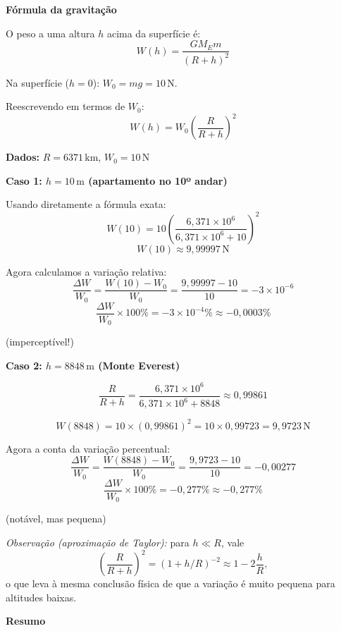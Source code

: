 
\textbf{Fórmula da gravitação}

O peso a uma altura $h$ acima da superfície é:
\[
W(h) = \frac{GM_E m}{(R+h)^2}
\]

Na superfície ($h=0$): $W_0 = mg = 10\,\text{N}$.

Reescrevendo em termos de $W_0$:
\[
W(h) = W_0 \left(\frac{R}{R+h}\right)^2
\]

\textbf{Dados:} $R = 6371\,\text{km}$, $W_0 = 10\,\text{N}$

\textbf{Caso 1: $h = 10\,\text{m}$ (apartamento no 10º andar)}

Usando diretamente a fórmula exata:
\[
W(10) = 10\left(\frac{6{,}371\times10^6}{6{,}371\times10^6+10}\right)^2
\]
\[
W(10) \approx 9{,}99997\,\text{N}
\]

Agora calculamos a variação relativa:
\[
\frac{\Delta W}{W_0} = \frac{W(10)-W_0}{W_0}
= \frac{9{,}99997-10}{10}
= -3\times 10^{-6}
\]
\[
\frac{\Delta W}{W_0}\times 100\% = -3\times 10^{-4}\% \approx \boxed{-0{,}0003\%}
\]

(imperceptível!)

\textbf{Caso 2: $h = 8848\,\text{m}$ (Monte Everest)}

\[
\frac{R}{R+h} = \frac{6{,}371 \times 10^6}{6{,}371 \times 10^6 + 8848} \approx 0{,}99861
\]

\[
W(8848) = 10 \times (0{,}99861)^2 = 10 \times 0{,}99723 = 9{,}9723\,\text{N}
\]

Agora a conta da variação percentual:
\[
\frac{\Delta W}{W_0} = \frac{W(8848)-W_0}{W_0}
= \frac{9{,}9723-10}{10}
= -0{,}00277
\]
\[
\frac{\Delta W}{W_0}\times 100\% = -0{,}277\% \approx \boxed{-0{,}277\%}
\]

(notável, mas pequena)

\medskip
\textit{Observação (aproximação de Taylor):} para $h\ll R$, vale
\[
\left(\frac{R}{R+h}\right)^2 = (1+h/R)^{-2} \approx 1-2\frac{h}{R},
\]
o que leva à mesma conclusão física de que a variação é muito pequena para altitudes baixas.

\textbf{Resumo}

